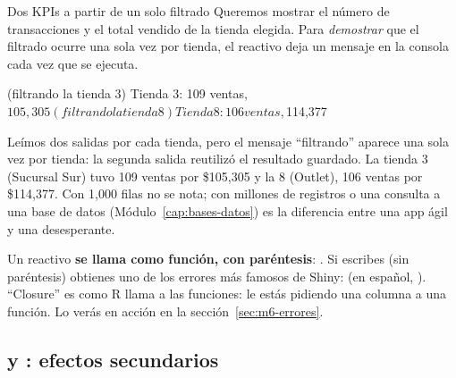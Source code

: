 \begin{ejemplo}{Dos KPIs a partir de un solo filtrado}
Queremos mostrar el número de transacciones y el total vendido de la tienda
elegida. Para \emph{demostrar} que el filtrado ocurre una sola vez por
tienda, el reactivo deja un mensaje en la consola cada vez que se ejecuta.
\end{ejemplo}

\begin{rsalida}
  (filtrando la tienda 3)
Tienda 3: 109 ventas, $105,305 
  (filtrando la tienda 8)
Tienda 8: 106 ventas, $114,377 
\end{rsalida}

Leímos dos salidas por cada tienda, pero el mensaje ``filtrando'' aparece
una sola vez por tienda: la segunda salida reutilizó el resultado guardado.
La tienda 3 (Sucursal Sur) tuvo 109 ventas por \$105,305 y la 8 (Outlet),
106 ventas por \$114,377. Con 1,000 filas no
se nota; con millones de registros o una consulta a una base de datos
(Módulo~\ref{cap:bases-datos}) es la diferencia entre una app ágil y una
desesperante.

\begin{advertencia}
Un reactivo \textbf{se llama como función, con paréntesis}:
. Si escribes  (sin
paréntesis) obtienes uno de los errores más famosos de Shiny:
 (en español,
). ``Closure'' es como R
llama a las funciones: le estás pidiendo una columna a una función. Lo
verás en acción en la sección~\ref{sec:m6-errores}.
\end{advertencia}

\subsection{\texorpdfstring{ y }{observe() y observeEvent()}: efectos secundarios}

